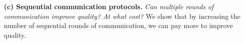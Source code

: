 \textbf{(c) Sequential communication protocols.} \textit{Can multiple rounds of communication improve quality? At what cost?} 
  We show that by increasing the number of sequential rounds of communication, we can  pay more to improve quality. 





